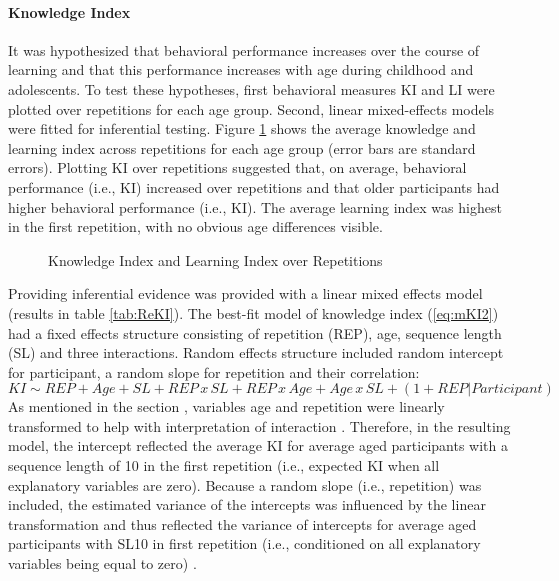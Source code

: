 \paragraph{Knowledge Index}
It was hypothesized that behavioral performance increases over the course of learning and that this performance increases with age during childhood and adolescents. To test these hypotheses, first behavioral measures KI and LI were plotted over repetitions for each age group. Second, linear mixed-effects models were fitted for inferential testing. 
Figure \ref{fig:KI_LI} shows the average knowledge and learning index across repetitions for each age group (error bars are standard errors). Plotting KI over repetitions suggested that, on average, behavioral performance (i.e., KI) increased over repetitions and that older participants had higher behavioral performance (i.e., KI). The average learning index was highest in the first repetition, with no obvious age differences visible. 
\begin{figure}[H]
    \centering
       
    \caption{Knowledge Index and Learning Index over Repetitions}
    \label{fig:KI_LI}
\end{figure}

Providing inferential evidence was provided with a linear mixed effects model (results in table \ref{tab:ReKI}). The best-fit model of knowledge index (\ref{eq:mKI2}) had a fixed effects structure consisting of repetition (REP), age, sequence length (SL) and three interactions. Random effects structure included random intercept for participant, a random slope for repetition and their correlation: 
\begin{equation}\label{eq:mKI2}
KI \sim REP + Age + SL + REP\,x\,SL + REP\,x\,Age + Age\,x\,SL + (1+REP | Participant)
\end{equation}
As mentioned in the section , variables age and repetition were linearly transformed to help with interpretation of interaction \parencite{hoxMultilevelAnalysisTechniques2017}. Therefore, in the resulting model, the intercept reflected the average KI for average aged participants with a sequence length of 10 in the first repetition (i.e., expected KI when all explanatory variables are zero). Because a random slope (i.e., repetition) was included, the estimated variance of the intercepts was influenced by the linear transformation and thus reflected the variance of intercepts for average aged participants with SL10 in first repetition (i.e., conditioned on all explanatory variables being equal to zero) \parencite{hoxMultilevelAnalysisTechniques2017}.

